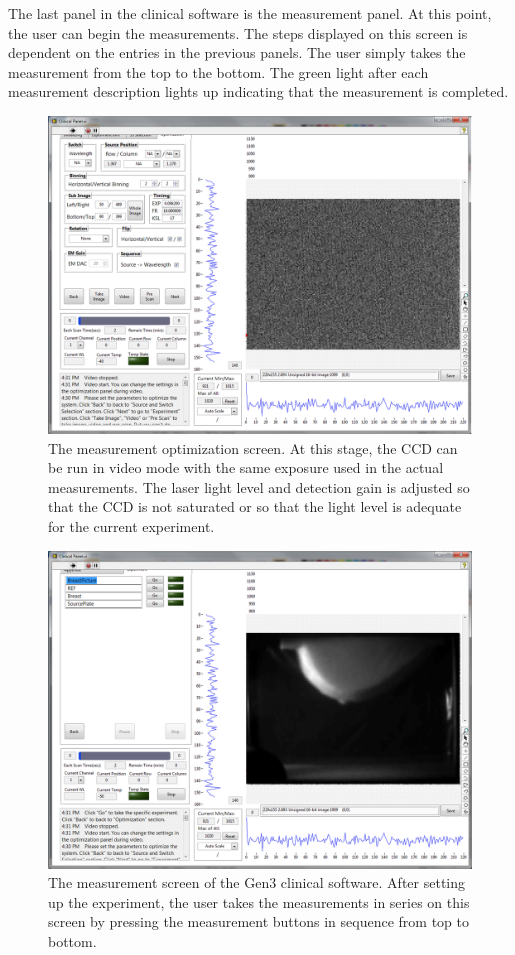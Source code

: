 The last panel in the clinical software is the measurement panel. At this point, the user can begin the measurements. The steps displayed on this screen is dependent on the entries in the previous panels. The user simply takes the measurement from the top to the bottom. The green light after each measurement description lights up indicating that the measurement is completed.
\vspace{3mm}
\begin{figure}[h]
\centering
\includegraphics[width=13.5cm]{./figures/A_Gen3Software/Clinical5.png}
\caption[The optimization panel in the clinical software]{The measurement optimization screen. At this stage, the CCD can be run in video mode with the same exposure used in the actual measurements. The laser light level and detection gain is adjusted so that the CCD is not saturated or so that the light level is adequate for the current experiment.}
\label{fig:Clinical5}
\end{figure}
\begin{figure}[t]
\centering
\includegraphics[width=13.5cm]{./figures/A_Gen3Software/Clinical6.png}
\caption[The measurement panel in the clinical software]{The measurement screen of the Gen3 clinical software. After setting up the experiment, the user takes the measurements in series on this screen by pressing the measurement buttons in sequence from top to bottom.}
\label{fig:Clinical6}
\end{figure}